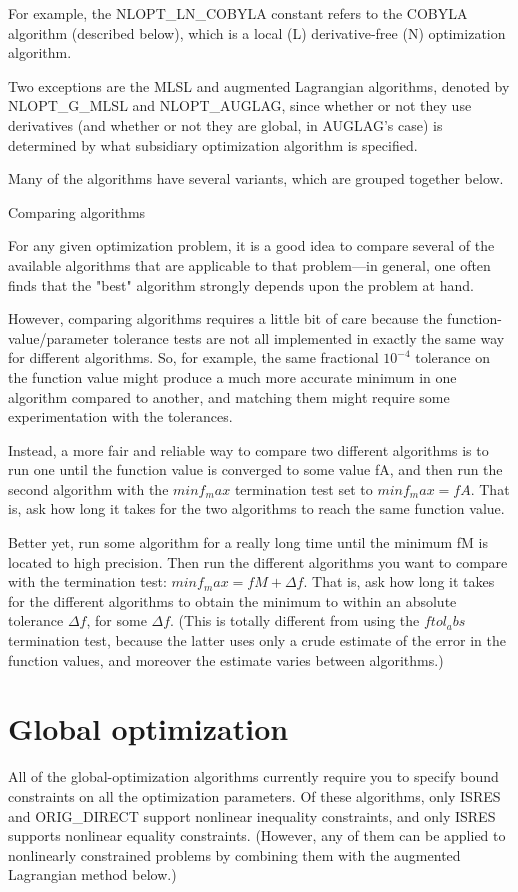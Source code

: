 For example, the NLOPT\_LN\_COBYLA constant refers to the COBYLA algorithm (described below), which is a local (L) derivative-free (N) optimization algorithm. 

Two exceptions are the MLSL and augmented Lagrangian algorithms, denoted by NLOPT\_G\_MLSL and NLOPT\_AUGLAG, since whether or not they use derivatives (and whether or not they are global, in AUGLAG's case) is determined by what subsidiary optimization algorithm is specified. 

Many of the algorithms have several variants, which are grouped together below. 

Comparing algorithms

For any given optimization problem, it is a good idea to compare several of the available algorithms that are applicable to that problem—in general, one often finds that the "best" algorithm strongly depends upon the problem at hand. 

However, comparing algorithms requires a little bit of care because the function-value/parameter tolerance tests are not all implemented in exactly the same way for different algorithms. So, for example, the same fractional $10^{−4}$ tolerance on the function value might produce a much more accurate minimum in one algorithm compared to another, and matching them might require some experimentation with the tolerances. 

Instead, a more fair and reliable way to compare two different algorithms is to run one until the function value is converged to some value fA, and then run the second algorithm with the $minf_max$ termination test set to $minf_max=fA$. That is, ask how long it takes for the two algorithms to reach the same function value. 

Better yet, run some algorithm for a really long time until the minimum fM is located to high precision. Then run the different algorithms you want to compare with the termination test: $minf_max=fM+\Delta f$. That is, ask how long it takes for the different algorithms to obtain the minimum to within an absolute tolerance $\Delta f$, for some $\Delta f$. (This is totally different from using the $ftol_abs$ termination test, because the latter uses only a crude estimate of the error in the function values, and moreover the estimate varies between algorithms.) 




\section{Global optimization}
All of the global-optimization algorithms currently require you to specify bound constraints on all the optimization parameters. Of these algorithms, only ISRES and ORIG\_DIRECT support nonlinear inequality constraints, and only ISRES supports nonlinear equality constraints. (However, any of them can be applied to nonlinearly constrained problems by combining them with the augmented Lagrangian method below.) 

